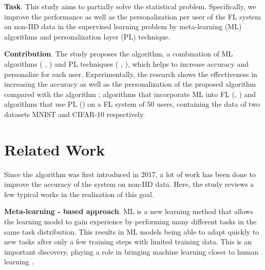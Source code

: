 \documentclass[runningheads]{llncs}
\begin{document}
\textbf{Task}. This study aims to partially solve the statistical problem. Specifically, we improve the performance as well as the personalization per user of the FL system on non-IID data in the supervised learning problem by meta-learning (ML) algorithms \cite{hospedales2020meta} and personalization layer (PL) technique.

\textbf{Contribution}. The study proposes the  algorithm, a combination of ML algorithms ( \cite{finn2017model},  \cite{li2017meta}) and PL techniques ( \cite{arivazhagan2019federated},  \cite{liang2020think}), which helps to increase accuracy and personalize for each user. Experimentally, the research shows the effectiveness in increasing the accuracy as well as the personalization of the proposed algorithm compared with the algorithm ; algorithms that incorporate ML into FL \cite{chen2018federated} (, ) and algorithms that use PL () on a FL system of 50 users, containing the data of two datasets MNIST \cite{deng2012mnist} and CIFAR-10 \cite{krizhevsky2009learning} respectively.

\section{Related Work}

Since the  algorithm was first introduced in 2017, a lot of work has been done to improve the accuracy of the system on non-IID data. Here, the study reviews a few typical works in the realization of this goal.



\textbf{Meta-learning - based approach}. ML is a new learning method that allows the learning model to gain experience by performing many different tasks in the same task distribution. This results in ML models being able to adapt quickly to new tasks after only a few training steps with limited training data. This is an important discovery, playing a role in bringing machine learning closer to human learning \cite{harlow1949formation}.
\end{document}
